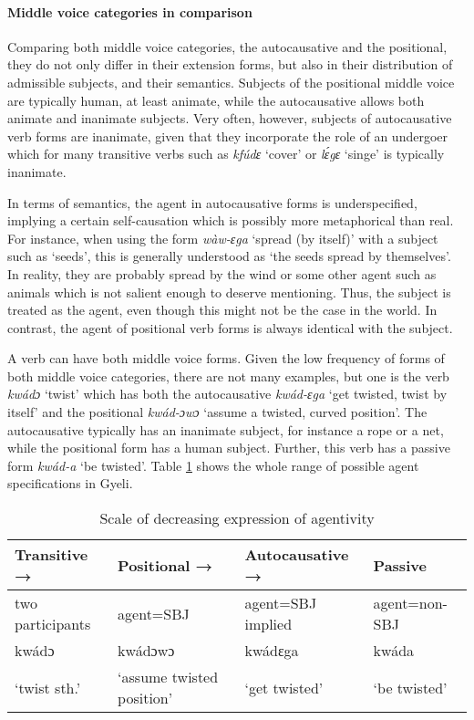 \paragraph{Middle voice categories in comparison} Comparing both middle voice categories, the autocausative and the positional, they do not only differ in their extension forms, but also in their distribution of admissible subjects, and their semantics. Subjects of the positional middle voice are typically human, at least animate, while the autocausative allows both animate and inanimate subjects. Very often, however, subjects of autocausative verb forms are inanimate, given that they incorporate the role of an undergoer which for many transitive verbs such as {\itshape kfúdɛ} `cover' or {\itshape lɛ́gɛ} `singe' is typically inanimate.

In terms of semantics, the agent in autocausative forms is underspecified, implying a certain self-causation which is possibly more metaphorical than real. For instance, when using the form {\itshape wàw-ɛga} `spread (by itself)' with a subject such as `seeds', this is generally understood as `the seeds spread by themselves'. In reality, they are probably spread by the wind or some other agent such as animals which is not salient enough to deserve mentioning. Thus, the subject is treated as the agent, even though this might not be the case in the world. In contrast, the agent of positional verb forms is always identical with the subject.


A verb can have both middle voice forms. Given the low frequency of forms of both middle voice categories, there are not many examples, but one is the verb {\itshape kwádɔ} `twist' which has both the autocausative {\itshape kwád-ɛga} `get twisted, twist by itself' and the positional {\itshape kwád-ɔwɔ} `assume a twisted, curved position'.  The autocausative typically has an inanimate subject, for instance a rope or a net, while the positional form has a human subject. Further, this verb has a passive form {\itshape kwád-a} `be twisted'. Table \ref{Tab:VerbScale} shows the whole range of possible agent specifications in Gyeli.


\begin{table} 
\begin{tabular}{lp{3cm}ll}
Transitive → &   Positional → &    Autocausative → &    Passive \\  \midrule
two participants &  agent=SBJ & agent=SBJ implied &  agent=non-SBJ \\  \midrule
kwádɔ &  kwádɔwɔ & kwádɛga  & kwáda  \\
`twist sth.' &  `assume twisted position' &  `get twisted' &  `be twisted' \\

\end{tabular}
\caption{Scale of decreasing expression of agentivity}
 \label{Tab:VerbScale}
\end{table}



